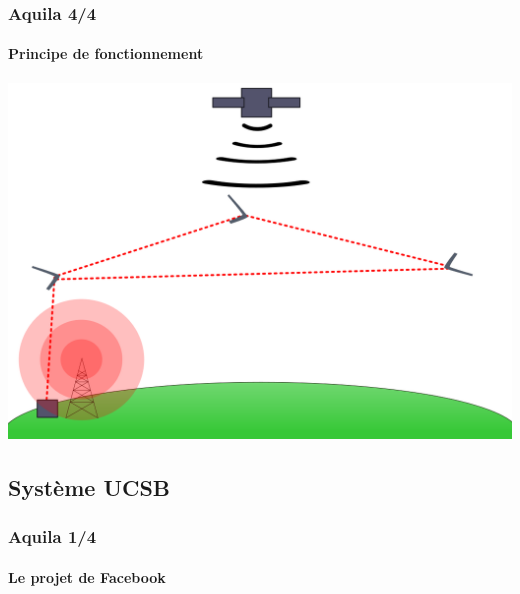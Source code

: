 \documentclass{beamer}
\begin{document}
\begin{frame}
  \frametitle{Aquila 4/4}
  \framesubtitle{Principe de fonctionnement}
  \includegraphics[width=\textwidth]{../Images/schema_aquila.png}
\end{frame}

\subsection{Système UCSB}
\begin{frame}
  \frametitle{Aquila 1/4}
  \framesubtitle{Le projet de Facebook}
  \end{frame}
  
\end{document}
